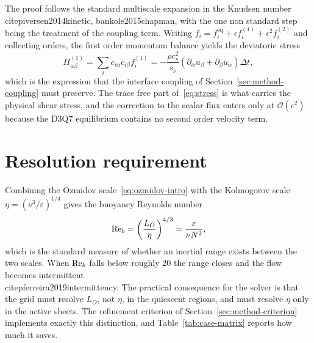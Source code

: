 The proof follows the standard multiscale expansion in the Knudsen number
\\citep{iversen2014kinetic, bankole2015chapman}, with
the one non standard step being the treatment of the coupling term. Writing
$f_i = f_i^{\mathrm{eq}} + \epsilon f_i^{(1)} + \epsilon^{2} f_i^{(2)}$ and
collecting orders, the first order momentum balance yields the deviatoric stress
\begin{equation}
  \Pi_{\alpha\beta}^{(1)} = \sum_i c_{i\alpha} c_{i\beta} f_i^{(1)}
    = -\frac{\rho c_s^{2}}{s_\nu}
      \left( \partial_\alpha u_\beta + \partial_\beta u_\alpha \right) \Delta t,
  \label{eq:stress}
\end{equation}
which is the expression that the interface coupling of
Section~\ref{sec:method-coupling} must preserve. The trace free part
of~\eqref{eq:stress} is what carries the physical shear stress, and the
correction to the scalar flux enters only at $\mathcal{O}(\epsilon^{2})$ because
the D3Q7 equilibrium contains no second order velocity term.

\section{Resolution requirement}
\label{sec:theory-resolution}

Combining the Ozmidov scale~\eqref{eq:ozmidov-intro} with the Kolmogorov scale
$\eta = (\nu^{3}/\varepsilon)^{1/4}$ gives the buoyancy Reynolds number
\begin{equation}
  \mathrm{Re}_b = \left( \frac{L_O}{\eta} \right)^{4/3} = \frac{\varepsilon}{\nu N^{2}},
  \label{eq:buoyancy-reynolds}
\end{equation}
which is the standard measure of whether an inertial range exists between the
two scales. When $\mathrm{Re}_b$ falls below roughly $20$ the range closes and the flow
becomes intermittent \\citep{ferreira2019intermittency}. The practical consequence for the solver is that the grid
must resolve $L_O$, not $\eta$, in the quiescent regions, and must resolve $\eta$
only in the active sheets. The refinement criterion of
Section~\ref{sec:method-criterion} implements exactly this distinction, and
Table~\ref{tab:case-matrix} reports how much it saves.

